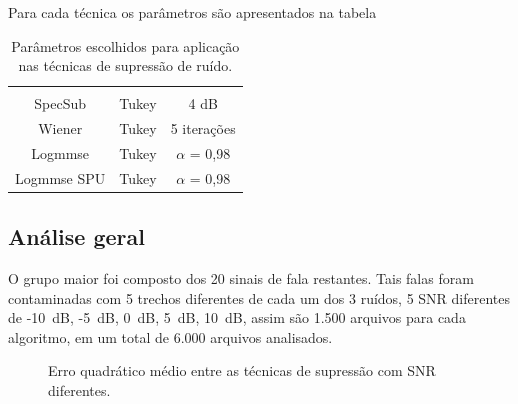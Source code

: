 Para cada técnica os parâmetros são apresentados na tabela 

\begin{table}[H]
\centering
\caption{Parâmetros escolhidos para aplicação nas técnicas de supressão de ruído.}
\label{Final2}
\begin{tabular}{ccc}
\multicolumn{1}{l}{\multirow{-2}{*}{}} & \cellcolor[HTML]{FFFFFF} & \cellcolor[HTML]{FFFFFF} \\
\rowcolor[HTML]{FFCCC9} 
SpecSub & Tukey & 4 dB \\
\rowcolor[HTML]{FFFFC7} 
Wiener & Tukey & 5 iterações \\
\rowcolor[HTML]{FFCCC9} 
Logmmse & Tukey & $\alpha$ = 0,98 \\
\rowcolor[HTML]{FFFFC7} 
Logmmse SPU & Tukey & $\alpha$ = 0,98
\end{tabular}%
\end{table}
        


\subsection{Análise geral}
\label{secgmaior}

O grupo maior foi composto dos 20 sinais de fala restantes. Tais falas foram contaminadas com 5 trechos diferentes de cada um dos 3 ruídos, 5 SNR diferentes de -10~dB, -5~dB, 0~dB, 5~dB, 10~dB, assim são 1.500 arquivos para cada algoritmo, em um total de 6.000 arquivos analisados.


\begin{figure}[H]
\quad
{}
\caption{Erro quadrático médio entre as técnicas de supressão com SNR diferentes.}
\label{aff1}
\end{figure}

